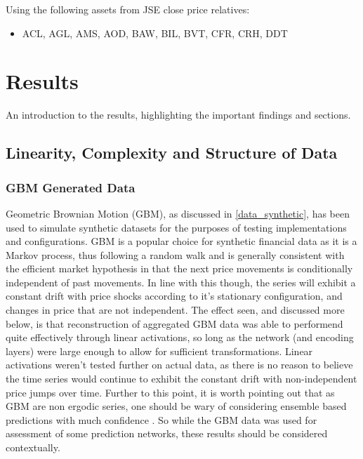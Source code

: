 \documentclass[a4paper,11pt,oneside]{article}
\theoremstyle{plain}
\theoremstyle{definition}
\begin{document}
Using the following assets from JSE close price relatives:

\begin{itemize}
	\item ACL, AGL, AMS, AOD, BAW, BIL, BVT, CFR, CRH, DDT
\end{itemize}











\newpage
\section{Results}\label{Results}


An introduction to the results, highlighting the important findings and sections. \todo{}


\subsection{Linearity, Complexity and Structure of Data}\label{results_linearity}

\subsubsection{GBM Generated Data}\label{results_gbm_data}

Geometric Brownian Motion (GBM), as discussed in \ref{data_synthetic}, has been used to simulate synthetic datasets for the purposes of testing implementations and configurations. GBM is a popular choice for synthetic financial data as it is a Markov process, thus following a random walk and is generally consistent with the efficient market hypothesis in that the next price movements is conditionally independent of past movements. In line with this though, the series will exhibit a constant drift with price shocks according to it's stationary configuration, and changes in price that are not independent. The effect seen, and discussed more below, is that reconstruction of aggregated GBM data was able to performend quite effectively through linear activations, so long as the network (and encoding layers) were large enough to allow for sufficient transformations. Linear activations weren't tested further on actual data, as there is no reason to believe the time series would continue to exhibit the constant drift with non-independent price jumps over time. Further to this point, it is worth pointing out that as GBM are non ergodic series, one should be wary of considering ensemble based predictions with much confidence \cite{Peters}. So while the GBM data was used for assessment of some prediction networks, these results should be considered contextually.
\end{document}
